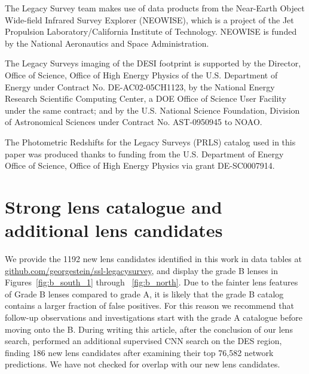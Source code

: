 \documentclass{aastex631}
\begin{document}
The Legacy Survey team makes use of data products from the Near-Earth Object Wide-field Infrared Survey Explorer (NEOWISE), which is a project of the Jet Propulsion Laboratory/California Institute of Technology. NEOWISE is funded by the National Aeronautics and Space Administration.

The Legacy Surveys imaging of the DESI footprint is supported by the Director, Office of Science, Office of High Energy Physics of the U.S. Department of Energy under Contract No. DE-AC02-05CH1123, by the National Energy Research Scientific Computing Center, a DOE Office of Science User Facility under the same contract; and by the U.S. National Science Foundation, Division of Astronomical Sciences under Contract No. AST-0950945 to NOAO.

The Photometric Redshifts for the Legacy Surveys (PRLS) catalog used in this paper was produced thanks to funding from the U.S. Department of Energy Office of Science, Office of High Energy Physics via grant DE-SC0007914.

\appendix
\section{Strong lens catalogue and additional lens candidates}
\label{app:additional_lenses}

We provide the 1192 new lens candidates  identified in this work in data tables at \href{https://github.com/georgestein/ssl-legacysurvey}{github.com/georgestein/ssl-legacysurvey}, and display the grade B lenses in Figures~\ref{fig:b_south_1} through ~\ref{fig:b_north}. Due to the fainter lens features of Grade B lenses compared to grade A, it is likely that the grade B catalog contains a larger fraction of false positives. For this reason we recommend that follow-up observations and investigations start with the grade A catalogue before moving onto the B. During writing this article, after the conclusion of our lens search,   \citet{rojas2021strong} performed an additional supervised CNN search on the DES region, finding 186 new lens candidates after examining their top 76,582 network predictions. We have not checked for overlap with our new lens candidates.
\end{document}
